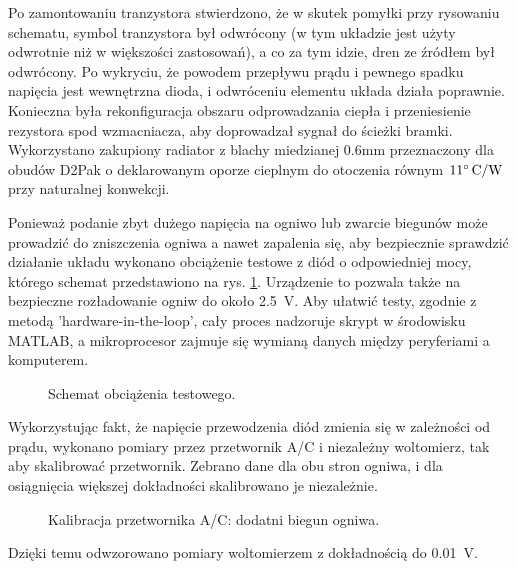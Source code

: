 \documentclass[polish,engineer]{polsl-msth}
\begin{document}
Po zamontowaniu tranzystora stwierdzono, że w skutek pomyłki przy rysowaniu schematu, symbol tranzystora był odwrócony (w tym układzie jest użyty odwrotnie niż w większości zastosowań), a co za tym idzie, dren ze źródłem był odwrócony. Po wykryciu, że powodem przepływu prądu i pewnego spadku napięcia jest wewnętrzna dioda, i odwróceniu elementu układa działa poprawnie. Konieczna była rekonfiguracja obszaru odprowadzania ciepła i przeniesienie rezystora spod wzmacniacza, aby doprowadzał sygnał do ścieżki bramki. Wykorzystano zakupiony radiator z blachy miedzianej 0.6mm przeznaczony dla obudów D2Pak o deklarowanym oporze cieplnym do otoczenia równym $\mathrm{11\degree \,C/W}$ przy naturalnej konwekcji. 

Ponieważ podanie zbyt dużego napięcia na ogniwo lub zwarcie biegunów może prowadzić do zniszczenia ogniwa a nawet zapalenia się, aby bezpiecznie sprawdzić działanie układu wykonano obciążenie testowe z diód o odpowiedniej mocy, którego schemat przedstawiono na rys. \ref{img:testload}. Urządzenie to pozwala także na bezpieczne rozładowanie ogniw do około 2.5~V.
Aby ułatwić testy, zgodnie z metodą 'hardware-in-the-loop', cały proces nadzoruje skrypt w środowisku MATLAB, a mikroprocesor zajmuje się wymianą danych między peryferiami a komputerem.
\begin{figure}[hbtp]
    \centering
    \caption{Schemat obciążenia testowego. \label{img:testload}}
\end{figure}

Wykorzystując fakt, że napięcie przewodzenia diód zmienia się w zależności od prądu, wykonano pomiary przez przetwornik A/C i niezależny woltomierz, tak aby skalibrować przetwornik. Zebrano dane dla obu stron ogniwa, i dla osiągnięcia większej dokładności skalibrowano je niezależnie.
\begin{figure}[hbtp]
    
     \caption{Kalibracja przetwornika A/C: dodatni biegun ogniwa. \label{img:ADCfitting}}
\end{figure}
Dzięki temu odwzorowano pomiary woltomierzem z dokładnością do 0.01~V.
\end{document}
